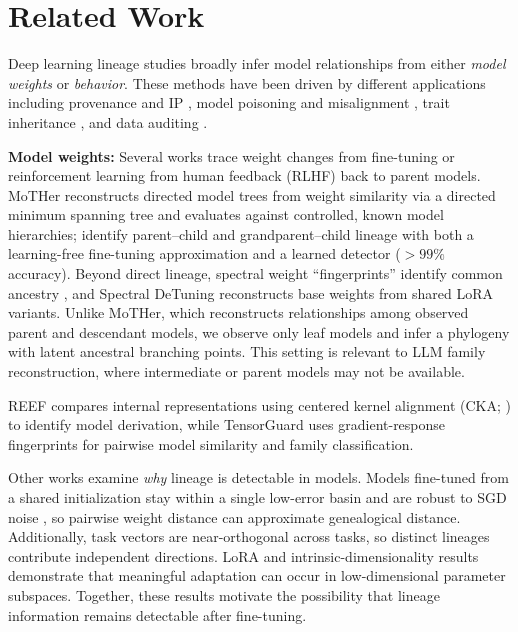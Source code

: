 \section{Related Work}
\label{sec:related}

Deep learning lineage studies broadly infer model relationships from either \emph{model weights} or \emph{behavior}. These methods have been driven by different applications including provenance and IP \citep{horwitz2025mother, zeng2024huref, nikolic2026model}, model poisoning and misalignment \citep{cloud2025subliminal}, trait inheritance \citep{cloud2025subliminal, agents2026same}, and data auditing \citep{zhu2025independence}. 

\textbf{Model weights:} Several works trace weight changes from fine-tuning or reinforcement learning from human feedback (RLHF) back to parent models. MoTHer \citep{horwitz2025mother} reconstructs directed model trees from weight similarity via a directed minimum spanning tree and evaluates against controlled, known model hierarchies; \citet{yu2025neural} identify parent--child and grandparent--child lineage with both a learning-free fine-tuning approximation and a learned detector ($>99\%$ accuracy). Beyond direct lineage, spectral weight ``fingerprints'' identify common ancestry \citep{ghostspec2025}, and Spectral DeTuning \citep{horwitz2024spectral} reconstructs base weights from shared LoRA variants. Unlike MoTHer, which reconstructs relationships among observed parent and descendant models, we observe only leaf models and infer a phylogeny with latent ancestral branching points. This setting is relevant to LLM family reconstruction, where intermediate or parent models may not be available.

REEF \citep{zhang2025reef} compares internal representations using centered kernel alignment (CKA; \citealp{kornblith2019similarity}) to identify model derivation, while TensorGuard \citep{tensorguard2025} uses gradient-response fingerprints for pairwise model similarity and family classification.

Other works examine \emph{why} lineage is detectable in models. Models fine-tuned from a shared initialization stay within a single low-error basin and are robust to SGD noise \citep{neyshabur2020,wortsman2022model,frankle2020linear}, so pairwise weight distance can approximate genealogical distance. Additionally, task vectors \citep{ilharco2023editing} are near-orthogonal across tasks, so distinct lineages contribute independent directions. LoRA \citep{hu2022lora} and intrinsic-dimensionality results \citep{aghajanyan2021intrinsic} demonstrate that meaningful adaptation can occur in low-dimensional parameter subspaces. Together, these results motivate the possibility that lineage information remains detectable after fine-tuning.

